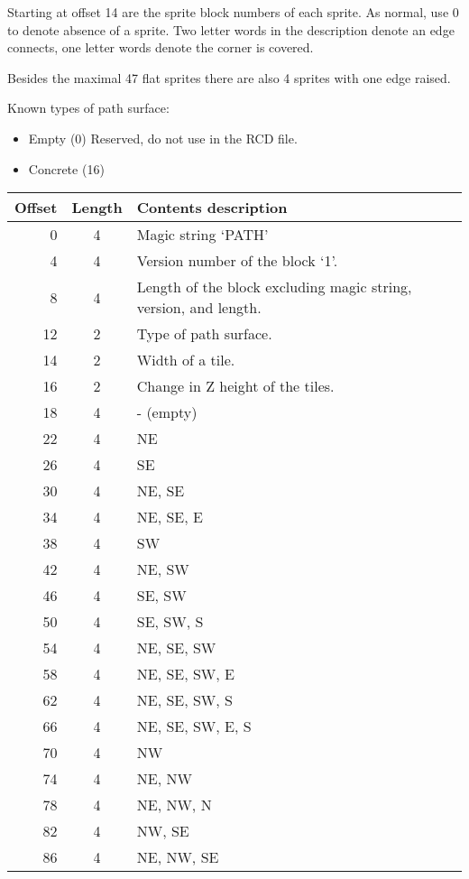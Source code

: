 \documentclass{article}
\begin{document}
Starting at offset 14 are the sprite block numbers of each sprite. As normal,
use 0 to denote absence of a sprite. Two letter words in the description
denote an edge connects, one letter words denote the corner is covered.

Besides the maximal 47 flat sprites there are also 4 sprites with one edge raised.

\medskip
\noindent
Known types of path surface:
\begin{itemize}
\item Empty (0) Reserved, do not use in the RCD{} file.
\item Concrete (16)
\end{itemize}

\begin{center}
\begin{tabular}{|r|c|l|} \hline
\textbf{Offset} & \textbf{Length} & \textbf{Contents description} \\ \hline
   0 &  4 & Magic string `PATH' \\
   4 &  4 & Version number of the block `1'. \\
   8 &  4 & Length of the block excluding magic string, version, and length. \\
  12 &  2 & Type of path surface. \\
  14 &  2 & Width of a tile. \\
  16 &  2 & Change in Z height of the tiles. \\
  18 &  4 & - (empty) \\
  22 &  4 & NE \\
  26 &  4 & SE \\
  30 &  4 & NE, SE \\
  34 &  4 & NE, SE, E \\
  38 &  4 & SW \\
  42 &  4 & NE, SW \\
  46 &  4 & SE, SW \\
  50 &  4 & SE, SW, S \\
  54 &  4 & NE, SE, SW \\
  58 &  4 & NE, SE, SW, E \\
  62 &  4 & NE, SE, SW, S \\
  66 &  4 & NE, SE, SW, E, S \\
  70 &  4 & NW \\
  74 &  4 & NE, NW \\
  78 &  4 & NE, NW, N \\
  82 &  4 & NW, SE \\
  86 &  4 & NE, NW, SE \\

\end{tabular}
\end{center}
\end{document}
